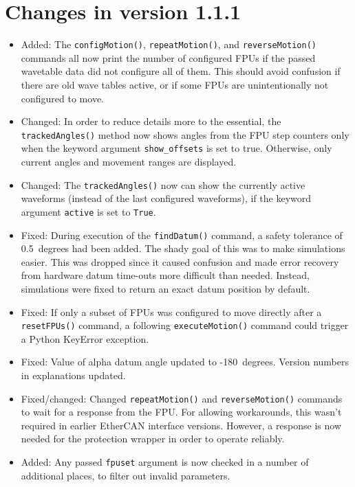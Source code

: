 \documentclass[fontsize=12,a4paper]{scrreprt}
\begin{document}
\section*{Changes in version 1.1.1}
\begin{itemize}
\item Added: The \texttt{configMotion()}, \texttt{repeatMotion()}, and
  \texttt{reverseMotion()} commands all now print the number of
  configured FPUs if the passed wavetable data did not configure all
  of them. This should avoid confusion if there are old wave tables
  active, or if some FPUs are unintentionally not configured to move.

\item Changed: In order to reduce details more to the essential, the
  \texttt{trackedAngles()} method now shows angles from the FPU step
  counters only when the keyword argument \texttt{show\_offsets} is
  set to true. Otherwise, only current angles and movement ranges are
  displayed.

\item Changed: The \texttt{trackedAngles()} now can show the currently
  active waveforms (instead of the last configured waveforms), if the
  keyword argument \texttt{active} is set to \texttt{True}.

\item Fixed: During execution of the \texttt{findDatum()} command, a
  safety tolerance of 0.5\degree\ degrees had been added. The shady goal of
  this was to make simulations easier. This was dropped since it
  caused confusion and made error recovery from hardware datum
  time-outs more difficult than needed. Instead, simulations were
  fixed to return an exact datum position by default.

\item Fixed: If only a subset of FPUs was configured to move directly
  after a \texttt{resetFPUs()} command, a following
  \texttt{executeMotion()} command could trigger a Python KeyError
  exception.

\item Fixed: Value of alpha datum angle updated to
  -180\degree\ degrees. Version numbers in explanations updated.

\item Fixed/changed: Changed \texttt{repeatMotion()} and
  \texttt{reverseMotion()} commands to wait for a response from the
  FPU. For allowing workarounds, this wasn't required in earlier
  EtherCAN interface versions.  However, a response is now needed for the
  protection wrapper in order to operate reliably.

\item Added: Any passed \texttt{fpuset} argument is now checked in a
  number of additional places, to filter out invalid parameters.
\end{itemize}
\end{document}

